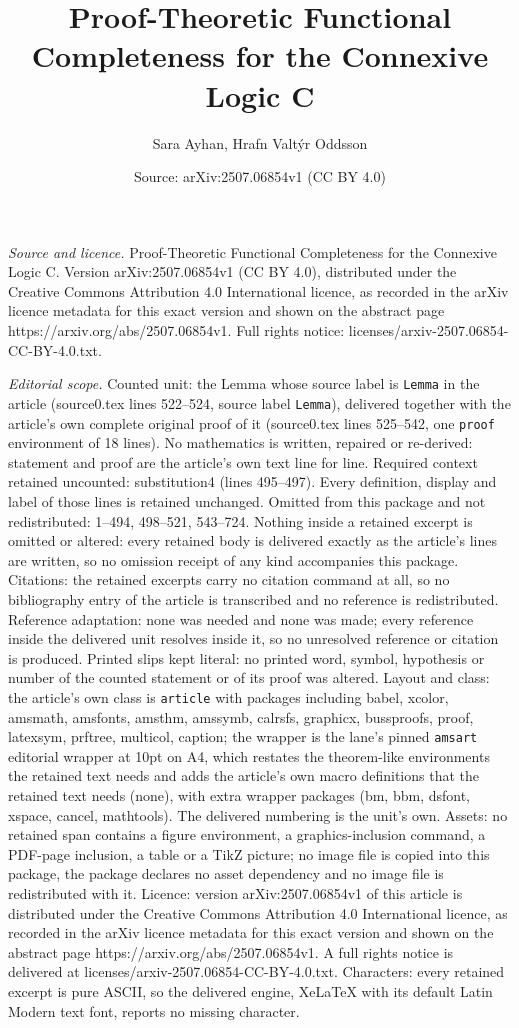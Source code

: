 \documentclass[10pt,a4paper]{amsart}
\title[Proof-Theoretic Functional Completeness for the Connexive Lo]{Proof-Theoretic Functional Completeness for the Connexive Logic C}
\author{Sara Ayhan, Hrafn Valt\'yr Oddsson}
\date{Source: arXiv:2507.06854v1 (CC BY 4.0)}
\begin{document}
\maketitle

\noindent\emph{Source and licence.} Proof-Theoretic Functional Completeness for the Connexive Logic C. Version arXiv:2507.06854v1 (CC BY 4.0), distributed under the Creative Commons Attribution 4.0 International licence, as recorded in the arXiv licence metadata for this exact version and shown on the abstract page https://arxiv.org/abs/2507.06854v1. Full rights notice: licenses/arxiv-2507.06854-CC-BY-4.0.txt.\par\smallskip

\noindent\textit{Editorial scope.} Counted unit: the Lemma whose source label is \texttt{Lemma} in the article (source0.tex lines 522--524, source label \texttt{Lemma}), delivered together with the article's own complete original proof of it (source0.tex lines 525--542, one \texttt{proof} environment of 18 lines). No mathematics is written, repaired or re-derived: statement and proof are the article's own text line for line. Required context retained uncounted: substitution4 (lines 495--497). Every definition, display and label of those lines is retained unchanged. Omitted from this package and not redistributed: 1--494, 498--521, 543--724. Nothing inside a retained excerpt is omitted or altered: every retained body is delivered exactly as the article's lines are written, so no omission receipt of any kind accompanies this package. Citations: the retained excerpts carry no citation command at all, so no bibliography entry of the article is transcribed and no reference is redistributed. Reference adaptation: none was needed and none was made; every reference inside the delivered unit resolves inside it, so no unresolved reference or citation is produced. Printed slips kept literal: no printed word, symbol, hypothesis or number of the counted statement or of its proof was altered. Layout and class: the article's own class is \texttt{article} with packages including babel, xcolor, amsmath, amsfonts, amsthm, amssymb, calrsfs, graphicx, bussproofs, proof, latexsym, prftree, multicol, caption; the wrapper is the lane's pinned \texttt{amsart} editorial wrapper at 10pt on A4, which restates the theorem-like environments the retained text needs and adds the article's own macro definitions that the retained text needs (none), with extra wrapper packages (bm, bbm, dsfont, xspace, cancel, mathtools). The delivered numbering is the unit's own. Assets: no retained span contains a figure environment, a graphics-inclusion command, a PDF-page inclusion, a table or a TikZ picture; no image file is copied into this package, the package declares no asset dependency and no image file is redistributed with it. Licence: version arXiv:2507.06854v1 of this article is distributed under the Creative Commons Attribution 4.0 International licence, as recorded in the arXiv licence metadata for this exact version and shown on the abstract page https://arxiv.org/abs/2507.06854v1. A full rights notice is delivered at licenses/arxiv-2507.06854-CC-BY-4.0.txt. Characters: every retained excerpt is pure ASCII, so the delivered engine, XeLaTeX with its default Latin Modern text font, reports no missing character.
\end{document}
